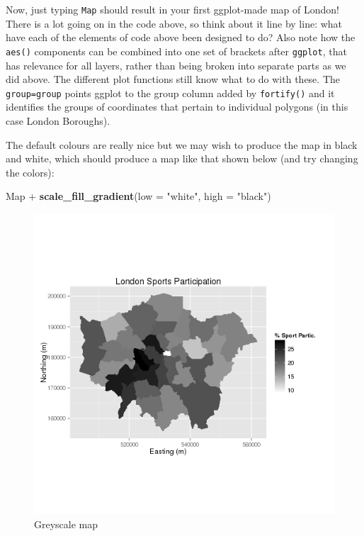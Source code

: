 \documentclass[]{article}
\newenvironment{Shaded}{}{}
\newcommand{\KeywordTok}[1]{\textcolor[rgb]{0.00,0.44,0.13}{\textbf{{#1}}}}
\newcommand{\DataTypeTok}[1]{\textcolor[rgb]{0.56,0.13,0.00}{{#1}}}
\newcommand{\StringTok}[1]{\textcolor[rgb]{0.25,0.44,0.63}{{#1}}}
\newcommand{\NormalTok}[1]{{#1}}
\begin{document}
Now, just typing \texttt{Map} should result in your first ggplot-made
map of London! There is a lot going on in the code above, so think about
it line by line: what have each of the elements of code above been
designed to do? Also note how the \texttt{aes()} components can be
combined into one set of brackets after \texttt{ggplot}, that has
relevance for all layers, rather than being broken into separate parts
as we did above. The different plot functions still know what to do with
these. The \texttt{group=group} points ggplot to the group column added
by \texttt{fortify()} and it identifies the groups of coordinates that
pertain to individual polygons (in this case London Boroughs).

The default colours are really nice but we may wish to produce the map
in black and white, which should produce a map like that shown below
(and try changing the colors):

\begin{Shaded}
\begin{Highlighting}[]
\NormalTok{Map +}\StringTok{ }\KeywordTok{scale_fill_gradient}\NormalTok{(}\DataTypeTok{low =} \StringTok{"white"}\NormalTok{, }\DataTypeTok{high =} \StringTok{"black"}\NormalTok{)}
\end{Highlighting}
\end{Shaded}

\begin{figure}[htbp]
\centering
\includegraphics{figure/Greyscale_map.png}
\caption{Greyscale map}
\end{figure}
\end{document}
